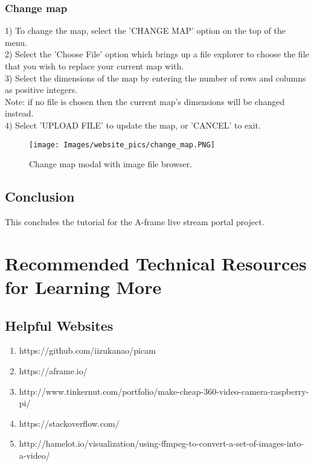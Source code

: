 \documentclass[onecolumn, draftclsnofoot,10pt, compsoc]{IEEEtran}
\begin{document}
\subsubsection{Change map}
1) To change the map, select the 'CHANGE MAP' option on the top of the menu. \\
2) Select the 'Choose File' option which brings up a file explorer to choose the file that you wish to replace your current map with. \\
3) Select the dimensions of the map by entering the number of rows and columns as positive integers. \\
\hspace*{1cm} Note: if no file is chosen then the current map's dimensions will be changed instead. \\
4) Select 'UPLOAD FILE' to update the map, or 'CANCEL' to exit.
\begin{figure}[h]
    \centering
    \texttt{[image: Images/website\_pics/change\_map.PNG]} 
    \caption{Change map modal with image file browser.}
\label{fig1}
\end{figure}
\subsection{Conclusion}
This concludes the tutorial for the A-frame live stream portal project.
\newpage
\section{Recommended Technical Resources for Learning More}

    \subsection{Helpful Websites}
        \begin{enumerate}
          \item https://github.com/iizukanao/picam
          \item https://aframe.io/
          \item http://www.tinkernut.com/portfolio/make-cheap-360-video-camera-raspberry-pi/
          \item https://stackoverflow.com/
          \item http://hamelot.io/visualization/using-ffmpeg-to-convert-a-set-of-images-into-a-video/
          
        \end{enumerate}
\end{document}
